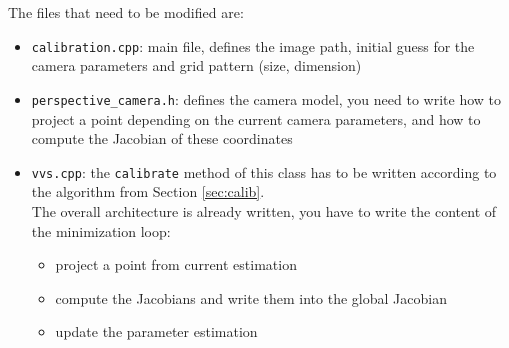 \documentclass{ecnreport}
\begin{document}
The files that need to be modified are:
\begin{itemize}
 \item \texttt{calibration.cpp}: main file, defines the image path, initial guess for the camera parameters and grid pattern (size, dimension)
 \item \texttt{perspective\_camera.h}: defines the camera model, you need to write how to project a point depending on the current camera parameters, and how to compute the Jacobian of these
 coordinates
 \item \texttt{vvs.cpp}: the \texttt{calibrate} method of this class has to be written according to the algorithm from Section \ref{sec:calib}.\\
 The overall architecture is already written, you have to write the content of the minimization loop:
 \begin{itemize}
  \item project a point from current estimation
  \item compute the Jacobians and write them into the global Jacobian
  \item  update the parameter estimation
 \end{itemize}
\end{itemize}
\end{document}
